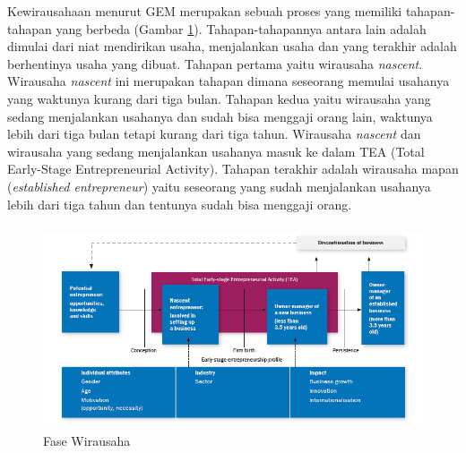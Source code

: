 Kewirausahaan menurut GEM merupakan sebuah proses yang memiliki tahapan-tahapan yang berbeda (Gambar \ref{fig:fasewirausaha}). Tahapan-tahapannya antara lain adalah dimulai dari niat mendirikan usaha, menjalankan usaha dan yang terakhir adalah berhentinya usaha yang dibuat. Tahapan pertama yaitu wirausaha \textit{nascent}. Wirausaha \textit{nascent} ini merupakan tahapan dimana seseorang memulai usahanya yang waktunya kurang dari tiga bulan. Tahapan kedua yaitu wirausaha yang sedang menjalankan usahanya dan sudah bisa menggaji orang lain, waktunya lebih dari tiga bulan tetapi kurang dari tiga tahun. Wirausaha \textit{nascent} dan wirausaha yang sedang menjalankan usahanya masuk ke dalam TEA (Total Early-Stage Entrepreneurial Activity). Tahapan terakhir adalah wirausaha mapan (\textit{established entrepreneur}) yaitu seseorang yang sudah menjalankan usahanya lebih dari tiga tahun dan tentunya sudah bisa menggaji orang.
\begin{figure} 
	\centering  
	\includegraphics[width=14cm, height=6cm]{GEM2016-wirausaha}  
	\caption[Fase Wirausaha]{Fase Wirausaha} 
	\label{fig:fasewirausaha} 
\end{figure}

